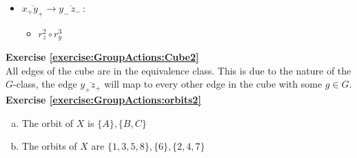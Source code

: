 \begin{enumerate}[(a)]
\begin{enumerate}[(i)]
\begin{multicols}{3}
\begin{itemize}
	 	\item
	 	$\overline{x_+y_+} \rightarrow \overline{y_-\,z_-\,}$: 
	 		\begin{itemize}
	 		\item
	 		$r_z^2 \circ r_y^3$
	 		\end{itemize}
	 		
	 	\end{itemize}
		\end{multicols}

\end {enumerate}
\end{enumerate}

\noindent\textbf{Exercise \ref{exercise:GroupActions:Cube2}}
\\
All edges of the cube are in the equivalence class.  This is due to the nature of the $G$-class, the edge $\overline{y_+z_+}$ will map to every other edge in the cube with some $g \in G$.
\\

\noindent\textbf{Exercise \ref{exercise:GroupActions:orbits2}}
\begin{enumerate}[(a)]
\item 
The orbit of $X$ is $\{A\}, \{B, C\}$

\item 
The orbits of $X$ are $\{1, 3, 5, 8\}, \{6\}, \{2, 4, 7\}$
\end{enumerate}

